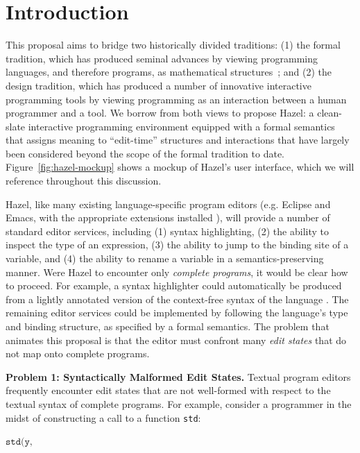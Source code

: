 \documentclass{purple}
\newcommand{\Hazel}[0]{\textsf{Hazel}\xspace}
\newcommand{\HazelEnv}[0]{\Hazel\xspace}
\begin{document}
\section{Introduction}

This proposal aims to bridge two historically divided traditions: (1) the formal
tradition, which has produced seminal advances by viewing programming languages,
and therefore programs, as mathematical structures~\cite{pfpl,Pierce:2002hj}; and (2) the design
tradition, which has produced a number of innovative interactive programming
tools by viewing programming as an interaction between a human programmer and a
tool. We borrow from both views to propose \HazelEnv: a clean-slate interactive programming
environment equipped with a formal semantics that assigns meaning 
to ``edit-time'' structures and interactions that have largely been 
considered beyond the scope of the formal tradition to date. Figure~\ref{fig:hazel-mockup} shows a mockup of \HazelEnv's user interface,
which we will reference throughout this discussion.

\HazelEnv, like many existing language-specific program editors (e.g. Eclipse
and Emacs, with the appropriate  
extensions installed \cite{gamma2004contributing}), will provide a number of standard editor services, including (1)
syntax highlighting, (2)
the ability to inspect the type of an expression, (3)
the ability to jump to the binding site of a variable, and (4)
the ability to rename a variable in a semantics-preserving manner. 
Were \HazelEnv to encounter only \emph{complete programs}, it would be clear how
to proceed. For example, a syntax highlighter could automatically be produced
from a lightly annotated version of the context-free syntax of the
language \cite{DBLP:conf/tools/KrahnRV08,DBLP:conf/cc/BrandDHJJKKMOSVVV01}. The remaining editor services could be implemented
by following the language's type and binding structure, as specified by a formal
semantics. The problem that animates this proposal is that the
editor must confront many \emph{edit states} that do not map onto complete
programs.

\vspace{0.25ex}
\noindent\textbf{Problem 1: Syntactically Malformed Edit States.} 
Textual program editors frequently encounter edit states
that are not well-formed with respect to the textual syntax of complete
programs. For example, consider a programmer in the midst of
constructing a call to a function \lstinline{std}: 

$\texttt{std(y, }$
\end{document}
